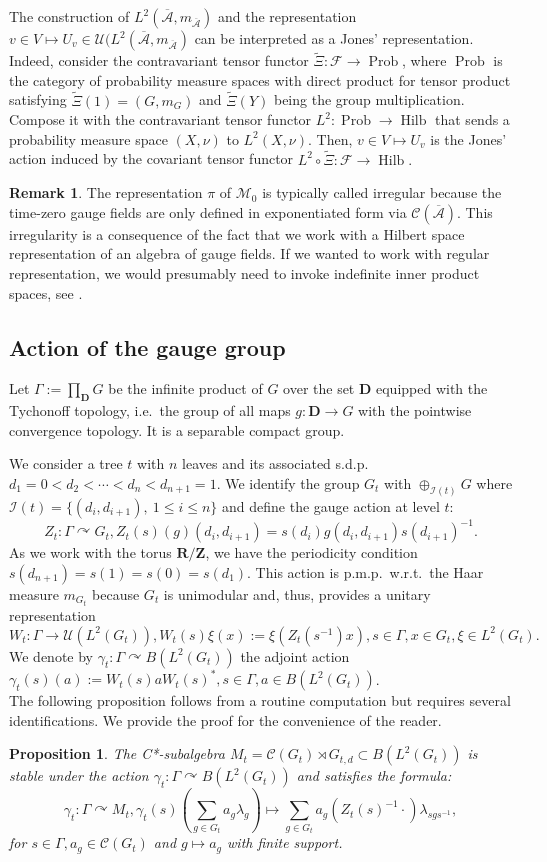 \documentclass[a4paper,12pt]{amsart}
\numberwithin{equation}{section}
\newtheorem{proposition}[theo]{Proposition}
\theoremstyle{definition}
\newtheorem{remark}[theo]{Remark}
\newcommand{\act}{\curvearrowright}
\newcommand{\oscrA}{{\overline{\mathscr{A}}}}
\newcommand{\scrC}{\mathscr C}
\newcommand{\D}{\mathbf D}
\newcommand{\dn}{d_1=0<d_2<\cdots<d_n<d_{n+1}=1}
\newcommand{\cF}{\mathcal F}
\DeclareMathOperator{\Hilb}{Hilb}
\newcommand{\ga}{\gamma}
\newcommand{\Ga}{\Gamma}
\newcommand{\cI}{\mathcal I}
\newcommand{\la}{\lambda}
\newcommand{\scrM}{\mathscr M}
\DeclareMathOperator{\Prob}{Prob}
\newcommand{\R}{\mathbf{R}}
\newcommand{\cU}{\mathcal U}
\newcommand{\Z}{\mathbf{Z}}
\begin{document}
The construction of $L^2(\oscrA,m_\oscrA)$ and the representation $v\in V\mapsto U_v \in \cU(L^2(\oscrA,m_\oscrA)$ can be interpreted as a Jones' representation. 
Indeed, consider the contravariant tensor functor $\tilde\Xi:\cF\to \Prob$, where $\Prob$ is the category of probability measure spaces with direct product for tensor product satisfying $\tilde\Xi(1) = (G,m_G)$ and $\tilde\Xi(Y)$ being the group multiplication. Compose it with the contravariant tensor functor $L^2:\Prob \to \Hilb$ that sends a probability measure space $(X,\nu)$ to $L^2(X,\nu)$.
Then, $v\in V\mapsto U_v$ is the Jones' action induced by the covariant tensor functor $L^2\circ \tilde\Xi:\cF\to \Hilb.$

\begin{remark}
\label{rem:gausslaw}
The representation $\pi$ of $\scrM_{0}$ is typically called irregular because the time-zero gauge fields are only defined in exponentiated form via $\scrC(\oscrA)$. This irregularity is a consequence of the fact that we work with a Hilbert space representation of an algebra of gauge fields. If we wanted to work with regular representation, we would presumably need to invoke indefinite inner product spaces, see \cite{Loeffelholz-03-Temporal-Gauge}.
\end{remark}

\subsection{Action of the gauge group}\label{sec:gauge}
Let $\Ga:=\prod_\D G$ be the infinite product of $G$ over the set $\D$ equipped with the Tychonoff topology, i.e.~the group of all maps $g:\D\to G$ with the pointwise convergence topology.
It is a separable compact group.

We consider a tree $t$ with $n$ leaves and its associated s.d.p.~$\dn$.
We identify the group $G_t$ with $\oplus_{\cI(t)} G$ where $\cI(t)=\{(d_i,d_{i+1}),\ 1\leq i \leq n \}$ and define the gauge action at level $t$:
$$Z_t:\Ga\act G_t, Z_t(s)(g)(d_i,d_{i+1}) = s(d_i) g(d_i , d_{i+1}) s(d_{i+1})^{-1}.$$
As we work with the torus $\R/\Z$, we have the periodicity condition $s(d_{n+1}) = s(1) = s(0) = s(d_1)$. 
This action is p.m.p.~w.r.t.~the Haar measure $m_{G_t}$ because $G_t$ is unimodular and, thus, provides a unitary representation
$$W_t:\Ga\to \cU(L^2(G_t)), W_t(s)\xi(x):= \xi(Z_t( s^{-1} ) x), s\in \Ga, x\in G_t, \xi \in L^2(G_t).$$
We denote by $\ga_t:\Ga\act B(L^2(G_t))$ the adjoint action $\ga_t(s)(a):= W_t(s) a W_t(s)^*, s\in \Ga, a\in B(L^2(G_t))$.\\[0.1cm]
The following proposition follows from a routine computation but requires several identifications. We provide the proof for the convenience of the reader.
\begin{proposition}\label{prop:gaugeaction}
The C*-subalgebra $M_t=\scrC(G_t)\rtimes G_{t,d} \subset B(L^2(G_t))$ is stable under the action $\ga_t:\Ga\act B(L^2(G_t))$ and satisfies the formula:
$$\ga_t : \Ga\act M_t, \ga_t(s)\left(\sum_{g\in G_t} a_g \la_g\right)\mapsto \sum_{g\in G_t} a_g(Z_t(s)^{-1}\cdot ) \la_{sgs^{-1}},$$
for $s\in \Ga, a_g\in\scrC(G_t)$ and $g\mapsto a_g$ with finite support.
\end{proposition}
\end{document}
